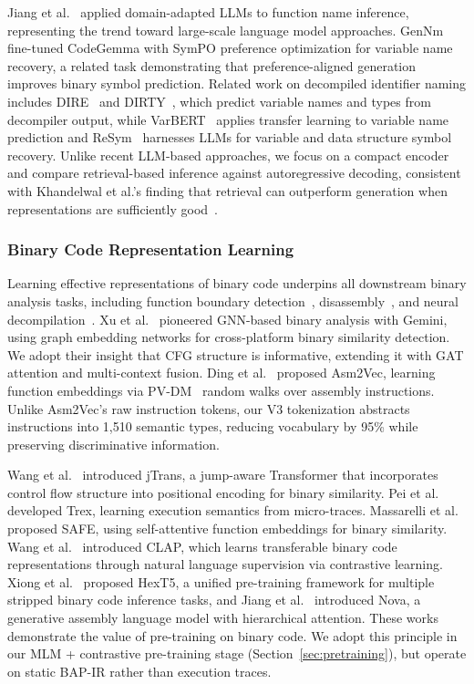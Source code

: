 \documentclass[sigconf,nonacm]{acmart}
\begin{document}
Jiang et al.~\cite{beyondclass} applied domain-adapted LLMs to function name inference, representing the trend toward large-scale language model approaches. GenNm~\cite{gennm} fine-tuned CodeGemma with SymPO preference optimization for variable name recovery, a related task demonstrating that preference-aligned generation improves binary symbol prediction. Related work on decompiled identifier naming includes DIRE~\cite{dire} and DIRTY~\cite{dirty}, which predict variable names and types from decompiler output, while VarBERT~\cite{varbert} applies transfer learning to variable name prediction and ReSym~\cite{resym} harnesses LLMs for variable and data structure symbol recovery. Unlike recent LLM-based approaches, we focus on a compact encoder and compare retrieval-based inference against autoregressive decoding, consistent with Khandelwal et al.'s finding that retrieval can outperform generation when representations are sufficiently good~\cite{knnlm,knnmt}.

\subsubsection{Binary Code Representation Learning}

Learning effective representations of binary code underpins all downstream binary analysis tasks, including function boundary detection~\cite{byteweight}, disassembly~\cite{xda}, and neural decompilation~\cite{katzdecomp}. Xu et al.~\cite{gemini} pioneered GNN-based binary analysis with Gemini, using graph embedding networks for cross-platform binary similarity detection. We adopt their insight that CFG structure is informative, extending it with GAT attention and multi-context fusion. Ding et al.~\cite{asm2vec} proposed Asm2Vec, learning function embeddings via PV-DM~\cite{word2vec} random walks over assembly instructions. Unlike Asm2Vec's raw instruction tokens, our V3 tokenization abstracts instructions into 1,510 semantic types, reducing vocabulary by 95\% while preserving discriminative information.

Wang et al.~\cite{jtrans} introduced jTrans, a jump-aware Transformer that incorporates control flow structure into positional encoding for binary similarity. Pei et al.~\cite{trex} developed Trex, learning execution semantics from micro-traces. Massarelli et al.~\cite{safe} proposed SAFE, using self-attentive function embeddings for binary similarity. Wang et al.~\cite{clap} introduced CLAP, which learns transferable binary code representations through natural language supervision via contrastive learning. Xiong et al.~\cite{hext5} proposed HexT5, a unified pre-training framework for multiple stripped binary code inference tasks, and Jiang et al.~\cite{nova} introduced Nova, a generative assembly language model with hierarchical attention. These works demonstrate the value of pre-training on binary code. We adopt this principle in our MLM + contrastive pre-training stage (Section~\ref{sec:pretraining}), but operate on static BAP-IR rather than execution traces.
\end{document}
